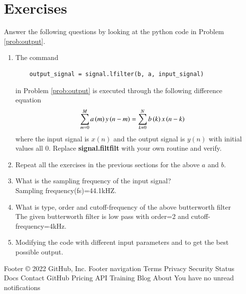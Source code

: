 \section{Exercises}
Answer the following questions by looking at the python code in Problem \ref{prob:output}.
\begin{enumerate}[label=\thesection.\arabic*]
\item
The command
\begin{lstlisting}
	output_signal = signal.lfilter(b, a, input_signal)
	\end{lstlisting}
in Problem \ref{prob:output} is executed through the following difference equation
\begin{equation}
\label{eq:iir_filter_gen}
 \sum _{m=0}^{M}a\left(m\right)y\left(n-m\right)=\sum _{k=0}^{N}b\left(k\right)x\left(n-k\right)
\end{equation}
%
where the input signal is $x(n)$ and the output signal is $y(n)$ with initial values all 0. Replace
\textbf{signal.filtfilt} with your own routine and verify.
%
\item Repeat all the exercises in the previous sections for the above $a$ and $b$.
\item What is the sampling frequency of the input signal?
\\
\solution
Sampling frequency(fs)=44.1kHZ.
\item
What is type, order and  cutoff-frequency of the above butterworth filter
\\
\solution
The given butterworth filter is low pass with order=2 and cutoff-frequency=4kHz.
%
\item
Modifying the code with different input parameters and to get the best possible output.
%
\end{enumerate}

Footer
© 2022 GitHub, Inc.
Footer navigation
Terms
Privacy
Security
Status
Docs
Contact GitHub
Pricing
API
Training
Blog
About
You have no unread notifications

